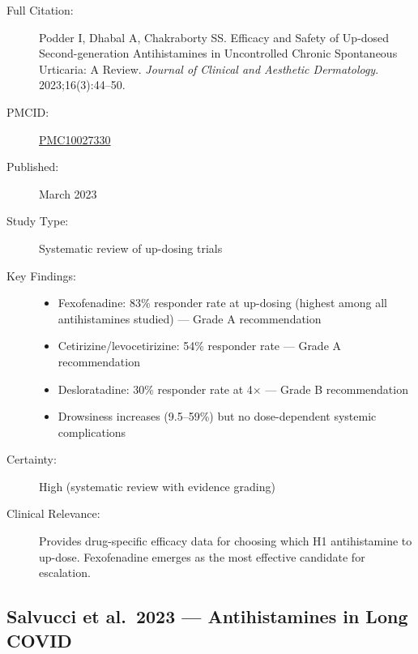 \begin{description}
    \item[Full Citation:] Podder I, Dhabal A, Chakraborty SS. Efficacy and Safety of Up-dosed Second-generation Antihistamines in Uncontrolled Chronic Spontaneous Urticaria: A Review. \textit{Journal of Clinical and Aesthetic Dermatology}. 2023;16(3):44--50.
    \item[PMCID:] \href{https://pmc.ncbi.nlm.nih.gov/articles/PMC10027330/}{PMC10027330}
    \item[Published:] March 2023
    \item[Study Type:] Systematic review of up-dosing trials
    \item[Key Findings:]
    \begin{itemize}
        \item Fexofenadine: 83\% responder rate at up-dosing (highest among all antihistamines studied) --- Grade A recommendation
        \item Cetirizine/levocetirizine: 54\% responder rate --- Grade A recommendation
        \item Desloratadine: 30\% responder rate at 4$\times$ --- Grade B recommendation
        \item Drowsiness increases (9.5--59\%) but no dose-dependent systemic complications
    \end{itemize}
    \item[Certainty:] High (systematic review with evidence grading)
    \item[Clinical Relevance:] Provides drug-specific efficacy data for choosing which H1 antihistamine to up-dose. Fexofenadine emerges as the most effective candidate for escalation.
\end{description}

\subsection{Salvucci et al.\ 2023 --- Antihistamines in Long COVID}

